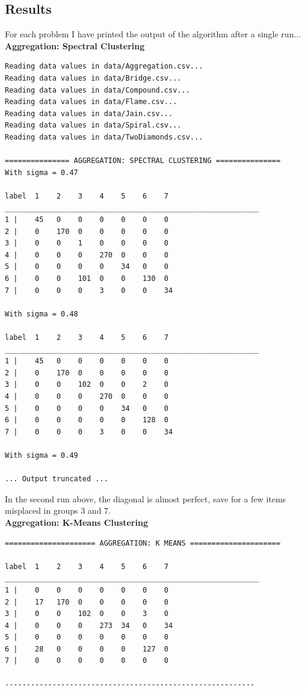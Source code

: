 \documentclass[11pt]{article}
\begin{document}
\subsection*{Results}
For each problem I have printed the output of the algorithm after a single run... 
\\[5pt]
\textbf{Aggregation: Spectral Clustering} 
\begin{verbatim}
Reading data values in data/Aggregation.csv...
Reading data values in data/Bridge.csv...
Reading data values in data/Compound.csv...
Reading data values in data/Flame.csv...
Reading data values in data/Jain.csv...
Reading data values in data/Spiral.csv...
Reading data values in data/TwoDiamonds.csv...

=============== AGGREGATION: SPECTRAL CLUSTERING ===============
With sigma = 0.47

label  1    2    3    4    5    6    7  
___________________________________________________________
1 |    45   0    0    0    0    0    0  
2 |    0    170  0    0    0    0    0  
3 |    0    0    1    0    0    0    0  
4 |    0    0    0    270  0    0    0  
5 |    0    0    0    0    34   0    0  
6 |    0    0    101  0    0    130  0  
7 |    0    0    0    3    0    0    34  

With sigma = 0.48

label  1    2    3    4    5    6    7   
___________________________________________________________
1 |    45   0    0    0    0    0    0   
2 |    0    170  0    0    0    0    0   
3 |    0    0    102  0    0    2    0   
4 |    0    0    0    270  0    0    0   
5 |    0    0    0    0    34   0    0   
6 |    0    0    0    0    0    128  0   
7 |    0    0    0    3    0    0    34   

With sigma = 0.49

... Output truncated ... 
\end{verbatim}
In the second run above, the diagonal is almost perfect, save for a few items misplaced in groups 3 and 7. 
\\[5pt]
\textbf{Aggregation: K-Means Clustering} 
\begin{verbatim}
===================== AGGREGATION: K MEANS =====================

label  1    2    3    4    5    6    7    
___________________________________________________________
1 |    0    0    0    0    0    0    0    
2 |    17   170  0    0    0    0    0    
3 |    0    0    102  0    0    3    0    
4 |    0    0    0    273  34   0    34    
5 |    0    0    0    0    0    0    0    
6 |    28   0    0    0    0    127  0    
7 |    0    0    0    0    0    0    0    

----------------------------------------------------------
\end{verbatim}
\end{document}
